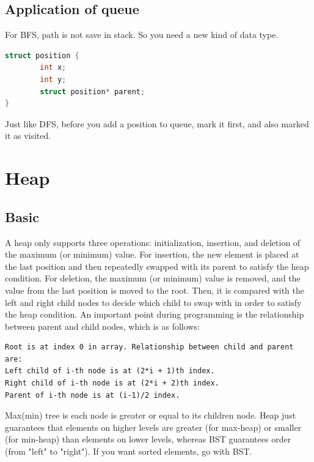 \documentclass[a4paper,11pt,twoside]{book}
\begin{document}
\subsection{Application of queue}

\par For BFS, path is not save in stack. So you need a new kind of data type. 
\begin{lstlisting}[frame=single, language=c++]
struct position {
        int x;
        int y;
        struct position* parent;
}
\end{lstlisting}
\par Just like DFS, before you add a position to queue, mark it first, and also marked it as visited. 


\section{Heap}
\subsection{Basic}


\par A heap only supports three operations: initialization, insertion, and deletion of the maximum (or minimum) value. For insertion, the new element is placed at the last position and then repeatedly swapped with its parent to satisfy the heap condition. For deletion, the maximum (or minimum) value is removed, and the value from the last position is moved to the root. Then, it is compared with the left and right child nodes to decide which child to swap with in order to satisfy the heap condition. An important point during programming is the relationship between parent and child nodes, which is as follows:
\begin{lstlisting}
Root is at index 0 in array. Relationship between child and parent are:
Left child of i-th node is at (2*i + 1)th index.
Right child of i-th node is at (2*i + 2)th index.
Parent of i-th node is at (i-1)/2 index.	
\end{lstlisting}

	
\par Max(min) tree is each node is greater or equal to its children node. Heap just guarantees that elements on higher levels are greater (for max-heap) or smaller (for min-heap) than elements on lower levels, whereas BST guarantees order (from "left" to "right"). If you want sorted elements, go with BST.
\end{document}
